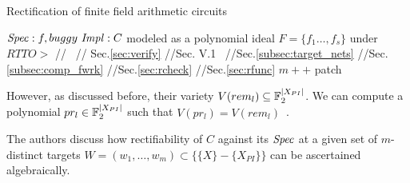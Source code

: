 \vspace{-0.13in}
\begin{algorithm}\label{rect_flow_alg}
\caption{Rectification of finite field arithmetic circuits}\label{pseudocode}
\begin{algorithmic}[1]
\Require ${\it Spec}:f, buggy~{\it Impl}: C$ modeled as a polynomial ideal $F=\{f_1\dots,f_s\}$ under $RTTO >$ 
 //~\cite{Vkrao:FMCAD18}
 // Sec.\ref{sec:verify}
 //Sec. V.1~\cite{Vkrao:FMCAD18}
 //Sec.\ref{subsec:target_nets}
\Do %
\label{prtn}
\label{ptrgt}
 //Sec.\ref{subsec:comp_fwrk}
 //Sec.\ref{sec:rcheck}
 //Sec.\ref{sec:rfunc}
\Else
{}
\EndIf
\Else
{}
\EndIf
\Else
\State $m++$
\EndIf
{} %
\State \Return patch
\EndProcedure
\end{algorithmic}
\end{algorithm}

 However, as discussed before, their variety 
$V(rem_l)\subseteq {\mathbb{F}}_{2}^{|X_{PI}|}$. We can compute a polynomial $pr_l \in {\mathbb{F}}_{2}^{|X_{PI}|}$
 such that $V(pr_l) = V(rem_l)$~\cite{Utkarsh:VLSI18}. 

The authors discuss how rectifiability of $C$ against its 
${\it Spec}$ at a given set of $m$-distinct targets 
$W=(w_1,\dots,w_m)\subset \{\{X\}-\{X_{PI}\}\}$ can be ascertained
algebraically. 
 
 \vspace{-0.18in}  
